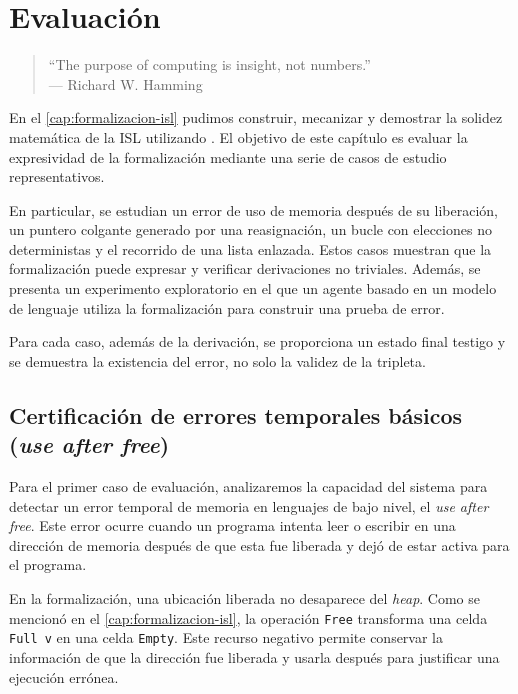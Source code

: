 \documentclass[a4paper,	11pt]{report}
\newif\ifdraft\drafttrue
\newcommand{\comm}[3]{\ifdraft{{\color{#1}[#2: #3]}}\fi}
\newcommand{\guido}[1]{\comm{blue}{Guido}{#1}}
\begin{document}
\chapter{Evaluación}

\label{cap:evaluacion}
\begin{quote}
``The purpose of computing is insight, not numbers.'' \\
\raggedleft --- Richard W. Hamming
\end{quote}

En el \autoref{cap:formalizacion-isl} pudimos construir,
mecanizar y demostrar la solidez matemática de la ISL utilizando \fstar{}.
El objetivo de este capítulo es evaluar la expresividad de la formalización mediante una serie de casos de estudio representativos.

En particular,
se estudian un error de uso de memoria después de su liberación,
un puntero colgante generado por una reasignación,
un bucle con elecciones no deterministas y el recorrido de una lista enlazada.
Estos casos muestran que la formalización puede expresar y verificar derivaciones no triviales.
Además,
se presenta un experimento exploratorio en el que un agente basado en un modelo de lenguaje utiliza la formalización para construir una prueba de error.

Para cada caso,
además de la derivación,
se proporciona un estado final testigo y se demuestra la existencia del error,
no solo la validez de la tripleta.


\section{Certificación de errores temporales básicos (\emph{use after free})}
\label{sec:uaf}
Para el primer caso de evaluación,
analizaremos la capacidad del sistema para detectar un error temporal de memoria en lenguajes de bajo nivel,
el \emph{use after free}.
Este error ocurre cuando un programa intenta leer o escribir en una dirección de memoria después de que esta fue liberada y dejó de estar activa para el programa.

En la formalización,
una ubicación liberada no desaparece del \emph{heap}.
Como se mencionó en el \autoref{cap:formalizacion-isl},
la operación \lstinline|Free| transforma una celda \lstinline|Full v| en una celda \lstinline|Empty|.
Este recurso negativo permite conservar la información de que la dirección fue liberada y usarla después para justificar una ejecución errónea.
\end{document}
